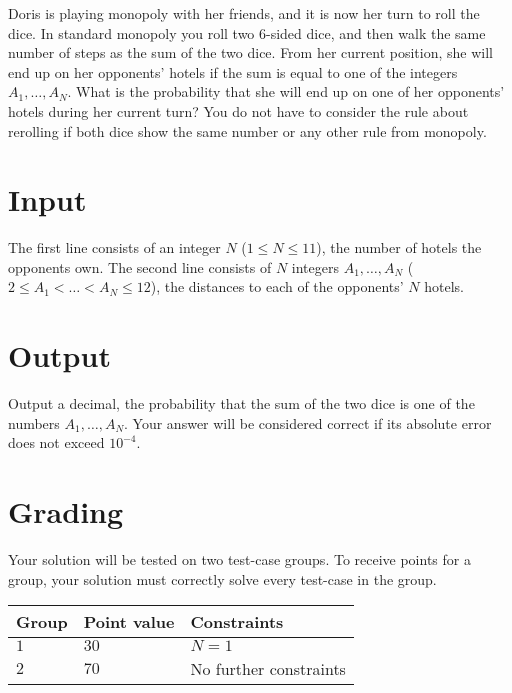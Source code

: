 \noindent
Doris is playing monopoly with her friends, and it is now her turn to roll the dice.
In standard monopoly you roll two $6$-sided dice, and then walk the same number of steps as the sum of the two dice.
From her current position, she will end up on her opponents' hotels if the sum is equal to one of the integers $A_1, \dots, A_N$.
What is the probability that she will end up on one of her opponents' hotels during her current turn?
You do not have to consider the rule about rerolling if both dice show the same number or any other rule from monopoly.

\section*{Input}
\noindent
The first line consists of an integer $N$ ($1 \leq N \leq 11$), the number of hotels the opponents own.
The second line consists of $N$ integers $A_1, \dots, A_N$ ($2 \leq A_1 < \dots < A_N \leq 12$), the distances to each of the opponents' $N$ hotels.

\section*{Output}
\noindent
Output a decimal, the probability that the sum of the two dice is one of the numbers $A_1, \dots, A_N$.
Your answer will be considered correct if its absolute error does not exceed $10^{-4}$.

\section*{Grading}
\noindent
Your solution will be tested on two test-case groups.
To receive points for a group, your solution must correctly solve every test-case in the group.

\noindent
\begin{tabular}{| l | l | l |}
\hline
  Group & Point value & Constraints \\ \hline
  $1$    & $30$       &  $N = 1$  \\ \hline
  $2$    & $70$       &  No further constraints \\ \hline
\end{tabular}
